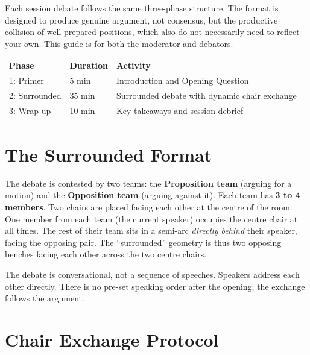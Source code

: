 \noindent Each session debate follows the same three-phase structure. The format is
designed to produce genuine argument, not consensus, but the productive
collision of well-prepared positions, which also do not necessarily need to reflect your own. This guide is for both the moderator
and debators.

\bigskip

\noindent\begin{tabular}{@{}p{3.5cm}p{1.8cm}p{4.5cm}@{}}
    \textbf{Phase} & \textbf{Duration} & \textbf{Activity} \\[4pt]
    1: Primer     & 5 min & Introduction and Opening Question \\
    2: Surrounded & 35 min & Surrounded debate with dynamic chair exchange \\
    3: Wrap-up    & 10 min & Key takeaways and session debrief \\
\end{tabular}

\section*{The Surrounded Format}

\noindent The debate is contested by two teams: the \textbf{Proposition team}
(arguing for a motion) and the \textbf{Opposition team} (arguing against it).
Each team has \textbf{3 to 4 members}. Two chairs are placed facing each other at
the centre of the room. One member from each team (the current speaker)
occupies the centre chair at all times. The rest of their team sits in a
semi-arc \textit{directly behind} their speaker, facing the opposing pair. The
``surrounded'' geometry is thus two opposing benches facing each other across
the two centre chairs.

\medskip
\noindent The debate is conversational, not a sequence of speeches. Speakers
address each other directly. There is no pre-set speaking order after the
opening; the exchange follows the argument.

\section*{Chair Exchange Protocol}

